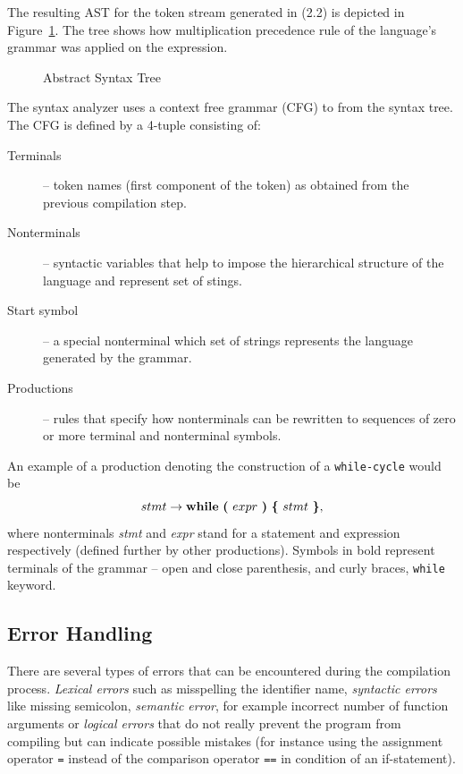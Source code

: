 \documentclass[
  digital, %
  table,   %
  lof,     %
  lot,     %
  oneside,
]{fithesis3}
\begin{document}
The resulting AST for the token stream generated in (2.2) is depicted in Figure~\ref{fig:compilers-abstract-syntax-tree}. The tree shows how multiplication precedence rule of the language's grammar was applied on the expression.

\begin{figure}
  \centering
  \caption{Abstract Syntax Tree}
  \label{fig:compilers-abstract-syntax-tree}
\end{figure}

The syntax analyzer uses a context free grammar (CFG) to from the syntax tree. The CFG is defined by a 4-tuple consisting of:
\begin{description}
  \item[Terminals] -- token names (first component of the token) as obtained from the previous compilation step.
  \item[Nonterminals] -- syntactic variables that help to impose the hierarchical structure of the language and represent set of stings.
  \item[Start symbol] -- a special nonterminal which set of strings represents the language generated by the grammar.
  \item[Productions] -- rules that specify how nonterminals can be rewritten to sequences of zero or more terminal and nonterminal symbols. 
\end{description}

An example of a production denoting the construction of a \texttt{while-cycle} would be
\begin{equation}
  stmt 
  \rightarrow 
  \textbf{while}\ 
  \textbf{(}\ expr\ \textbf{)}\ 
  \textbf{\{}\ stmt\ \textbf{\}} 
  \textnormal{,}
\end{equation}
\noindent
where nonterminals \textit{stmt} and \textit{expr} stand for a statement and expression respectively (defined further by other productions). Symbols in bold represent terminals of the grammar -- open and close parenthesis, and curly braces, \texttt{while} keyword.

  \subsection{Error Handling}
There are several types of errors that can be encountered during the compilation process. \textit{Lexical errors} such as misspelling the identifier name, \textit{syntactic errors} like missing semicolon, \textit{semantic error}, for example incorrect number of function arguments or \textit{logical errors} that do not really prevent the program from compiling but can indicate possible mistakes (for instance using the assignment operator \texttt{=} instead of the comparison operator \texttt{==} in condition of an if-statement).
\end{document}
